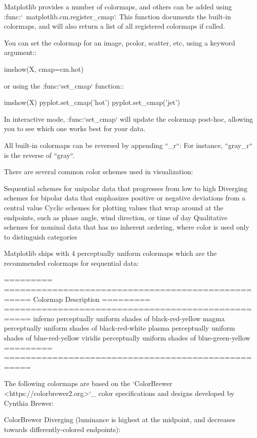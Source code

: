 \begin{DoxyVerb}Matplotlib provides a number of colormaps, and others can be added using
:func:`~matplotlib.cm.register_cmap`.  This function documents the built-in
colormaps, and will also return a list of all registered colormaps if
called.

You can set the colormap for an image, pcolor, scatter, etc,
using a keyword argument::

  imshow(X, cmap=cm.hot)

or using the :func:`set_cmap` function::

  imshow(X)
  pyplot.set_cmap('hot')
  pyplot.set_cmap('jet')

In interactive mode, :func:`set_cmap` will update the colormap post-hoc,
allowing you to see which one works best for your data.

All built-in colormaps can be reversed by appending ``_r``: For instance,
``gray_r`` is the reverse of ``gray``.

There are several common color schemes used in visualization:

Sequential schemes
  for unipolar data that progresses from low to high
Diverging schemes
  for bipolar data that emphasizes positive or negative deviations from a
  central value
Cyclic schemes
  for plotting values that wrap around at the endpoints, such as phase
  angle, wind direction, or time of day
Qualitative schemes
  for nominal data that has no inherent ordering, where color is used
  only to distinguish categories

Matplotlib ships with 4 perceptually uniform colormaps which are
the recommended colormaps for sequential data:

  =========   ===================================================
  Colormap    Description
  =========   ===================================================
  inferno     perceptually uniform shades of black-red-yellow
  magma       perceptually uniform shades of black-red-white
  plasma      perceptually uniform shades of blue-red-yellow
  viridis     perceptually uniform shades of blue-green-yellow
  =========   ===================================================

The following colormaps are based on the `ColorBrewer
<https://colorbrewer2.org>`_ color specifications and designs developed by
Cynthia Brewer:

ColorBrewer Diverging (luminance is highest at the midpoint, and
decreases towards differently-colored endpoints):


\end{DoxyVerb}
